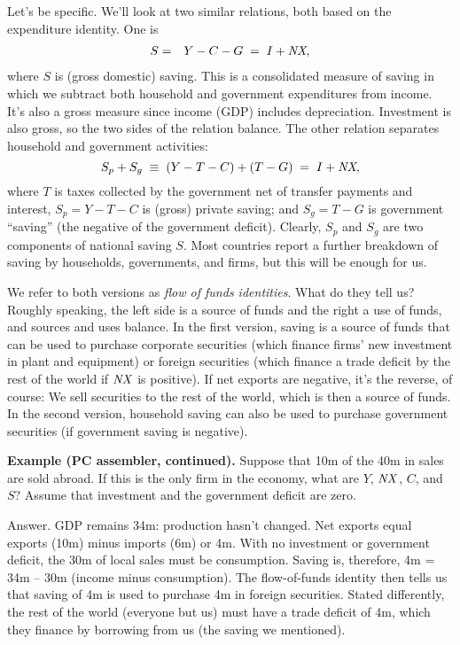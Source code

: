 Let's be specific.
We'll look at two similar relations, both based on the expenditure
identity.
One is
\begin{eqnarray}
           S &=& Y-C-G  \;=\;  I + \mbox{\em NX},
\end{eqnarray}
where $S$ is (gross domestic) saving.  
 
This is a consolidated measure of saving in which we subtract
both household and government expenditures from income.
It's also a gross measure since income (GDP) includes depreciation.
Investment is also gross, so the two sides of the relation balance.
The other relation separates household and government activities:
$$
                         S_p + S_g \;\equiv\; (Y-T-C) + (T-G)
                            \;=\;  I + \mbox{\em NX},
$$
where $T$ is taxes collected by the government net of transfer
payments and interest,
$S_p = Y-T-C$ is (gross) private saving; and
$S_g = T-G$ is government ``saving''
(the negative of the government deficit).
Clearly, $S_p$ and $S_g$ are two components of national saving $S$.
Most countries report a further breakdown of saving by
households, governments, and firms, but this will be enough for us.


We refer to both versions as {\it flow of funds identities\/}.
What do they tell us?
Roughly speaking, the left side is a source of funds and the right a use
of funds, and sources and uses balance.
In the first version, saving is a source of funds that can be used
to purchase corporate securities
(which finance firms' new investment in plant and equipment)
or foreign securities (which finance a trade deficit by the rest of the world
 if $ \mbox{\em NX\/} $ is positive).
If net exports are negative, it's the reverse, of course:
We sell securities to the rest of the world, which is then a source of funds.
In the second version, household saving can also be used to purchase government securities
(if government saving is negative).

\textbf{Example (PC assembler, continued).}
Suppose that 10m of the 40m in sales are sold abroad.
If this is the only firm in the economy, what are $Y$, $\mbox{\em NX\/}$, $C$, and $S$?
Assume that investment and the government deficit are zero.


Answer.  GDP remains 34m:  production hasn't changed.
Net exports equal exports (10m) minus imports (6m) or 4m.
With no investment or government deficit, the 30m of local sales must be consumption.
Saving is, therefore, 4m = 34m -- 30m (income minus consumption).
The flow-of-funds identity then tells us that saving of 4m is used to purchase 4m
in foreign securities. Stated differently, the rest of the world (everyone but us) must have a trade deficit
of 4m, which they finance by borrowing from us (the saving we mentioned).


